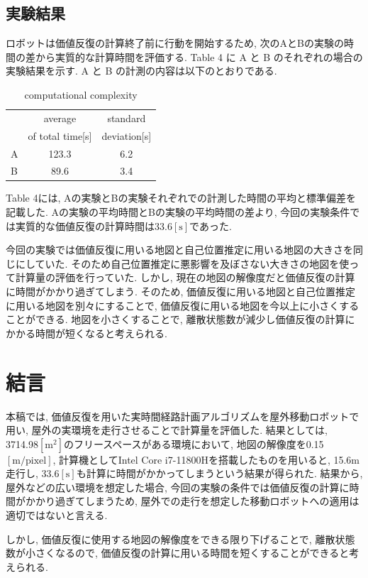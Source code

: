 \documentclass{jarticle}
\begin{document}
\subsection{実験結果}
ロボットは価値反復の計算終了前に行動を開始するため, 次のAとBの実験の時間の差から実質的な計算時間を評価する. 
Table 4 に A と B のそれぞれの場合の実験結果を示す. 
A と B の計測の内容は以下のとおりである.

\begin{table}[hbtp]
	\caption{computational complexity}
	\centering
	 \begin{tabular}{l|cc}
		\hline
		 & average & standard \\
		 & of total time[s] & deviation[s] \\
		\hline \hline
		A & 123.3 & 6.2 \\
		B & 89.6 & 3.4 \\
		\hline
	 \end{tabular}
 \end{table}

Table 4には, Aの実験とBの実験それぞれでの計測した時間の平均と標準偏差を記載した. 
Aの実験の平均時間とBの実験の平均時間の差より, 今回の実験条件では実質的な価値反復の計算時間は33.6$\mathrm{[s]}$であった.

今回の実験では価値反復に用いる地図と自己位置推定に用いる地図の大きさを同じにしていた. 
そのため自己位置推定に悪影響を及ぼさない大きさの地図を使って計算量の評価を行っていた. 
しかし, 現在の地図の解像度だと価値反復の計算に時間がかかり過ぎてしまう. 
そのため, 価値反復に用いる地図と自己位置推定に用いる地図を別々にすることで, 価値反復に用いる地図を今以上に小さくすることができる. 
地図を小さくすることで, 離散状態数が減少し価値反復の計算にかかる時間が短くなると考えられる. 
\section{結言}%
本稿では, 価値反復を用いた実時間経路計画アルゴリズムを屋外移動ロボットで用い, 屋外の実環境を走行させることで計算量を評価した. 
結果としては, 3714.98$\mathrm{[m^2]}$のフリースペースがある環境において, 
地図の解像度を0.15$\mathrm{[m/pixel]}$, 計算機としてIntel Core i7-11800Hを搭載したものを用いると, 
15.6$\mathrm{m}$走行し, 33.6$\mathrm{[s]}$も計算に時間がかかってしまうという結果が得られた. 
結果から, 屋外などの広い環境を想定した場合, 今回の実験の条件では価値反復の計算に時間がかかり過ぎてしまうため, 
屋外での走行を想定した移動ロボットへの適用は適切ではないと言える.

しかし, 価値反復に使用する地図の解像度をできる限り下げることで, 
離散状態数が小さくなるので, 価値反復の計算に用いる時間を短くすることができると考えられる.
\end{document}
